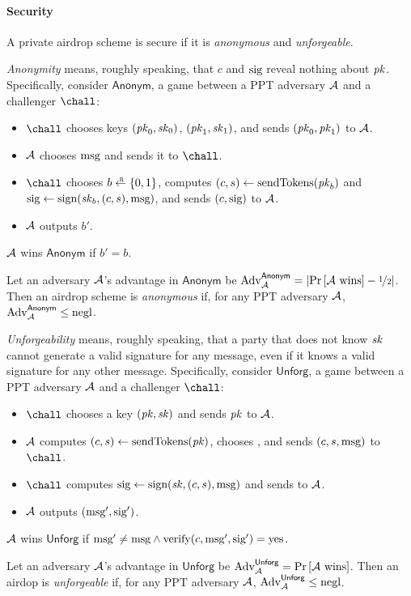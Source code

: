 \paragraph{Security} A private airdrop scheme is secure if it is \emph{anonymous} and \emph{unforgeable}.

\medskip\noindent\textit{Anonymity} means, roughly speaking, that $c$ and $\text{sig}$ reveal
    nothing about $\mathit{pk}$.
Specifically, consider $\mathsf{Anonym}$, a game between a PPT adversary $\mathcal{A}$
    and a challenger $\chall$:
%
\begin{itemize}
\item $\chall$ chooses keys $(\mathit{pk}_0, \mathit{sk}_0)$, $(\mathit{pk}_1, \mathit{sk}_1)$, and sends $(\mathit{pk}_0, \mathit{pk}_1)$ to $\mathcal{A}$.

\item $\mathcal{A}$ chooses $\text{msg}$ and sends it to $\chall$.

\item $\chall$ chooses $b \rgets \{0,1\}$,
computes $(c, s) \gets \text{sendTokens}(\mathit{pk}_b)$ and
$\text{sig} \gets \text{sign}(\mathit{sk}_b, (c, s), \text{msg})$,
and sends $(c, \text{sig})$ to $\mathcal{A}$.

\item $\mathcal{A}$ outputs $b'$.

\end{itemize}
%
$\mathcal{A}$ wins $\mathsf{Anonym}$ if $b' = b$.

\begin{definition}
Let an adversary $\mathcal{A}$'s advantage in $\mathsf{Anonym}$ be
$\mathrm{Adv}_{\mathcal{A}}^{\mathsf{Anonym}} = \left|{\operatorname*{Pr}\left[{\mathcal{A}~\text{wins}}\right] - \nicefrac{1}{2}}\right|$.
Then an airdrop scheme is \emph{anonymous} if, for any PPT adversary
    $\mathcal{A}$, $\mathrm{Adv}_{\mathcal{A}}^{\mathsf{Anonym}} \le \text{negl}$.
\end{definition}


\medskip\noindent\textit{Unforgeability} means, roughly speaking, that
    a party that does not know $\mathit{sk}$ cannot generate a valid signature
    for any message, even if it knows a valid signature for any other
    message.
Specifically, consider $\mathsf{Unforg}$, a game between a PPT adversary
    $\mathcal{A}$ and a challenger $\chall$:
%
\begin{itemize}
\item $\chall$ chooses a key $(\mathit{pk}, \mathit{sk})$ and sends $\mathit{pk}$ to $\mathcal{A}$.

\item $\mathcal{A}$ computes $(c, s) \gets \text{sendTokens}(\mathit{pk})$, chooses \msg, and sends $(c, s, \text{msg})$ to $\chall$.

\item $\chall$ computes $\text{sig} \gets \text{sign}(\mathit{sk}, (c, s), \text{msg})$ and sends to $\mathcal{A}$.

\item $\mathcal{A}$ outputs $(\text{msg}', \text{sig}')$.

\end{itemize}
%
$\mathcal{A}$ wins $\mathsf{Unforg}$ if $\text{msg}' \neq \text{msg} \wedge \text{verify}(c, \text{msg}', \text{sig}') = \text{yes}$.

\begin{definition}
Let an adversary $\mathcal{A}$'s advantage in $\mathsf{Unforg}$ be
$\mathrm{Adv}_{\mathcal{A}}^{\mathsf{Unforg}} = \operatorname*{Pr}\left[{\mathcal{A}~\text{wins}}\right]$.
Then an airdop is \emph{unforgeable} if, for any PPT adversary $\mathcal{A}$,
$\mathrm{Adv}_{\mathcal{A}}^{\mathsf{Unforg}} \le \text{negl}$.
\end{definition}

